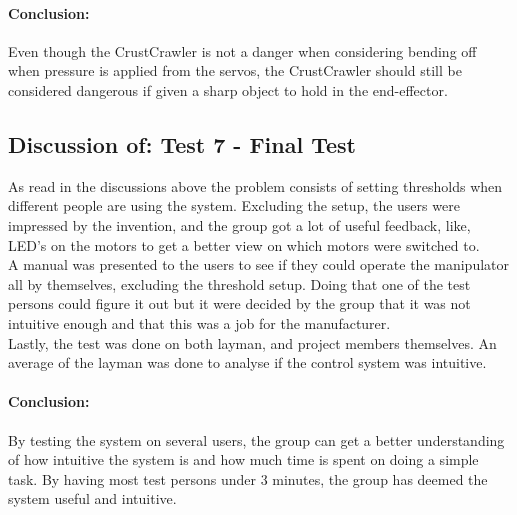 \paragraph{Conclusion:} Even though the CrustCrawler is not a danger when considering bending off when pressure is applied from the servos, the CrustCrawler should still be considered dangerous if given a sharp object to hold in the end-effector.

\subsection*{Discussion of: Test 7 - Final Test}
As read in the discussions above the problem consists of setting thresholds when different people are using the system. Excluding the setup, the users were impressed by the invention, and the group got a lot of useful feedback, like, LED's on the motors to get a better view on which motors were switched to.\\
A manual was presented to the users to see if they could operate the manipulator all by themselves, excluding the threshold setup. Doing that one of the test persons could figure it out but it were decided by the group that it was not intuitive enough and that this was a job for the manufacturer.\\
Lastly, the test was done on both layman, and project members themselves. An average  of the layman was done to analyse if the control system was intuitive. 
\paragraph{Conclusion:} By testing the system on several users, the group can get a better understanding of how intuitive the system is and how much time is spent on doing a simple task. By having most test persons under 3 minutes, the group has deemed the system useful and intuitive.